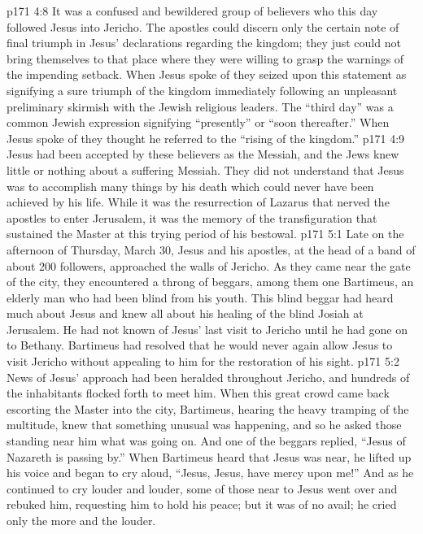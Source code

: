 \vs p171 4:8 \pc It was a confused and bewildered group of believers who this day followed Jesus into Jericho. The apostles could discern only the certain note of final triumph in Jesus’ declarations regarding the kingdom; they just could not bring themselves to that place where they were willing to grasp the warnings of the impending setback. When Jesus spoke of  they seized upon this statement as signifying a sure triumph of the kingdom immediately following an unpleasant preliminary skirmish with the Jewish religious leaders. The “third day” was a common Jewish expression signifying “presently” or “soon thereafter.” When Jesus spoke of  they thought he referred to the “rising of the kingdom.”
\vs p171 4:9 Jesus had been accepted by these believers as the Messiah, and the Jews knew little or nothing about a suffering Messiah. They did not understand that Jesus was to accomplish many things by his death which could never have been achieved by his life. While it was the resurrection of Lazarus that nerved the apostles to enter Jerusalem, it was the memory of the transfiguration that sustained the Master at this trying period of his bestowal.
\vs p171 5:1 Late on the afternoon of Thursday, March 30, Jesus and his apostles, at the head of a band of about 200 followers, approached the walls of Jericho. As they came near the gate of the city, they encountered a throng of beggars, among them one Bartimeus, an elderly man who had been blind from his youth. This blind beggar had heard much about Jesus and knew all about his healing of the blind Josiah at Jerusalem. He had not known of Jesus’ last visit to Jericho until he had gone on to Bethany. Bartimeus had resolved that he would never again allow Jesus to visit Jericho without appealing to him for the restoration of his sight.
\vs p171 5:2 News of Jesus’ approach had been heralded throughout Jericho, and hundreds of the inhabitants flocked forth to meet him. When this great crowd came back escorting the Master into the city, Bartimeus, hearing the heavy tramping of the multitude, knew that something unusual was happening, and so he asked those standing near him what was going on. And one of the beggars replied, “Jesus of Nazareth is passing by.” When Bartimeus heard that Jesus was near, he lifted up his voice and began to cry aloud, “Jesus, Jesus, have mercy upon me!” And as he continued to cry louder and louder, some of those near to Jesus went over and rebuked him, requesting him to hold his peace; but it was of no avail; he cried only the more and the louder.
